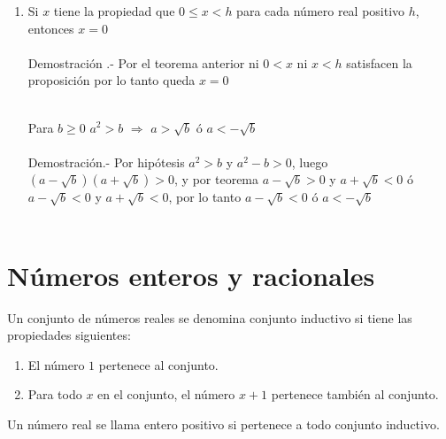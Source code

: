 \begin{enumerate}
\item Si $x$ tiene la propiedad que $0\leq x < h$ para cada número real positivo $h$, entonces $x=0$\\\\
Demostración .- \; Por el teorema anterior ni $0<x$ ni $x<h$ satisfacen la proposición por lo tanto queda $x=0$\\\\

\begin{lema}
Para $b\geq 0$ $a^2>b$ $\Rightarrow$ $a>\sqrt{b}$ ó $a<-\sqrt{b}$\\\\
Demostración.- \;
Por hipótesis $a^2>b$ y $a^2-b>0$, luego \; $(a-\sqrt{b})(a+\sqrt{b})>0$, y por teorema  \; $a-\sqrt{b}>0$ \; y \; $a+\sqrt{b}<0$ \; ó \; $a-\sqrt{b}<0$ \; y \; $a+\sqrt{b}<0$, por lo tanto $a-\sqrt{b}<0$ \; ó \; $a<-\sqrt{b}$\\\\
\end{lema}
\end{enumerate}

\section{Números enteros y racionales}
\begin{tcolorbox}[colframe=white]
\begin{def.}
Un conjunto de números reales se denomina conjunto inductivo si tiene las propiedades siguientes:
\begin{enumerate}[\bfseries a)]
\item El número $1$ pertenece al conjunto.
\item Para todo $x$ en el conjunto, el número $x+1$ pertenece también al conjunto.
\end{enumerate}
\end{def.}
\begin{def.}
Un número real se llama entero positivo si pertenece a todo conjunto inductivo.
\end{def.}
\end{tcolorbox}

\setcounter{section}{7}
